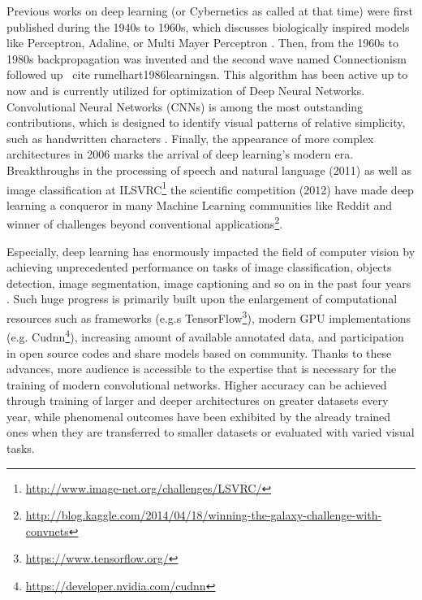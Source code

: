     Previous works on deep learning (or Cybernetics as called at that time) were first published during the 1940s to 1960s, which discusses biologically inspired models like Perceptron, Adaline, or Multi Mayer Perceptron \cite{rosenblatt2000probabilistic, schmidhuber2015deep}. Then, from the 1960s to 1980s backpropagation was invented and the second wave named Connectionism followed up \ cite {rumelhart1986learning}sn. This algorithm has been active up to now and is currently utilized for optimization of Deep Neural Networks. Convolutional Neural Networks (CNNs) is among the most outstanding contributions, which is designed to identify visual patterns of relative simplicity, such as handwritten characters \cite{lecun1995convolutional}. Finally, the appearance of more complex architectures in 2006 marks the arrival of deep learning’s modern era\cite{hinton2006fast,bengio2007greedy,huang2007unsupervised}. Breakthroughs in the processing of speech and natural language (2011) as well as image classification at ILSVRC\footnote{\url{http://www.image-net.org/challenges/LSVRC/}} the scientific competition (2012) have made deep learning a conqueror in many Machine Learning communities like Reddit and winner of challenges beyond conventional applications\footnote{\url{http://blog.kaggle.com/2014/04/18/winning-the-galaxy-challenge-with-convnets}}. 

    Especially, deep learning has enormously impacted the field of computer vision by achieving unprecedented performance on tasks of image classification, objects detection, image segmentation, image captioning and so on in the past four years \cite{DBLP:journals/corr/GuWKMSSLWW15}. Such huge progress is primarily built upon the enlargement of computational resources such as frameworks (e.g.s TensorFlow\footnote{\url{https://www.tensorflow.org/}}), modern GPU implementations (e.g.  Cudnn\footnote{\url{https://developer.nvidia.com/cudnn}}), increasing amount of available annotated data, and participation in open source codes and share models based on community. Thanks to these advances, more audience is accessible to the expertise that is necessary for the training of modern convolutional networks. Higher accuracy can be achieved through training of larger and deeper architectures on greater datasets every year, while phenomenal outcomes have been exhibited by the already trained ones when they are transferred to smaller datasets or evaluated with varied visual tasks. 


